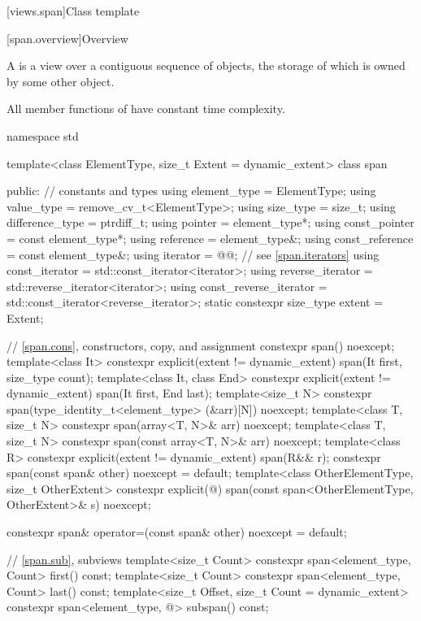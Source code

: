 [views.span]{Class template }

[span.overview]{Overview}

\pnum
{}%
A  is a view over a contiguous sequence of objects,
the storage of which is owned by some other object.

\pnum
All member functions of  have constant time complexity.

%
\begin{codeblock}
namespace std {
  template<class ElementType, size_t Extent = dynamic_extent>
  class span {
  public:
    // constants and types
    using element_type = ElementType;
    using value_type = remove_cv_t<ElementType>;
    using size_type = size_t;
    using difference_type = ptrdiff_t;
    using pointer = element_type*;
    using const_pointer = const element_type*;
    using reference = element_type&;
    using const_reference = const element_type&;
    using iterator = @@;        // see \ref{span.iterators}
    using const_iterator = std::const_iterator<iterator>;
    using reverse_iterator = std::reverse_iterator<iterator>;
    using const_reverse_iterator = std::const_iterator<reverse_iterator>;
    static constexpr size_type extent = Extent;

    // \ref{span.cons}, constructors, copy, and assignment
    constexpr span() noexcept;
    template<class It>
      constexpr explicit(extent != dynamic_extent) span(It first, size_type count);
    template<class It, class End>
      constexpr explicit(extent != dynamic_extent) span(It first, End last);
    template<size_t N>
      constexpr span(type_identity_t<element_type> (&arr)[N]) noexcept;
    template<class T, size_t N>
      constexpr span(array<T, N>& arr) noexcept;
    template<class T, size_t N>
      constexpr span(const array<T, N>& arr) noexcept;
    template<class R>
      constexpr explicit(extent != dynamic_extent) span(R&& r);
    constexpr span(const span& other) noexcept = default;
    template<class OtherElementType, size_t OtherExtent>
      constexpr explicit(@\seebelow@) span(const span<OtherElementType, OtherExtent>& s) noexcept;

    constexpr span& operator=(const span& other) noexcept = default;

    // \ref{span.sub}, subviews
    template<size_t Count>
      constexpr span<element_type, Count> first() const;
    template<size_t Count>
      constexpr span<element_type, Count> last() const;
    template<size_t Offset, size_t Count = dynamic_extent>
      constexpr span<element_type, @\seebelow@> subspan() const;

}}
\end{codeblock}
